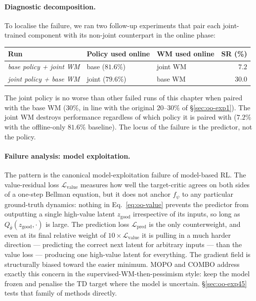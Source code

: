 \paragraph{Diagnostic decomposition.} To localise the failure, we ran two follow-up experiments that pair each joint-trained component with its non-joint counterpart in the online phase:
\begin{center}
\begin{tabular}{lll r}
\toprule
Run & Policy used online & WM used online & SR (\%) \\
\midrule
\emph{base policy + joint WM}  & base ($81.6\%$) & joint WM &  $7.2$ \\
\emph{joint policy + base WM}  & joint ($79.6\%$) & base WM & $30.0$ \\
\bottomrule
\end{tabular}
\end{center}
The joint policy is no worse than other failed runs of this chapter when paired with the base WM ($30\%$, in line with the original $20$--$30\%$ of \S\ref{sec:oo-exp1}). The joint WM destroys performance regardless of which policy it is paired with ($7.2\%$ with the offline-only $81.6\%$ baseline). The locus of the failure is the predictor, not the policy.

\paragraph{Failure analysis: model exploitation.} The pattern is the canonical model-exploitation failure of model-based RL. The value-residual loss $\mathcal{L}_{\text{value}}$ measures how well the target-critic agrees on both sides of a one-step Bellman equation, but it does not anchor $f_\psi$ to any particular ground-truth dynamics: nothing in Eq.~\eqref{eq:oo-value} prevents the predictor from outputting a single high-value latent $z_{\text{good}}$ irrespective of its inputs, so long as $Q_{\bar\theta}(z_{\text{good}}, \cdot)$ is large. The prediction loss $\mathcal{L}_{\text{pred}}$ is the only counterweight, and even at its final relative weight of $10\times \mathcal{L}_{\text{value}}$ it is pulling in a much harder direction --- predicting the correct next latent for arbitrary inputs --- than the value loss --- producing one high-value latent for everything. The gradient field is structurally biased toward the easier minimum. MOPO \cite{yu2020mopomodelbasedofflinepolicy} and COMBO \cite{yu2021combo} address exactly this concern in the supervised-WM-then-pessimism style: keep the model frozen and penalise the TD target where the model is uncertain. \S\ref{sec:oo-exp45} tests that family of methods directly.

